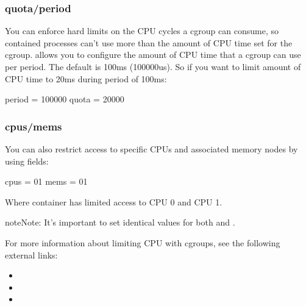 \documentclass[letterpaper,10pt,english]{sphinxmanual}
\begin{document}
\subsubsection{quota/period}
\label{\detokenize{cgroups:quota-period}}
You can enforce hard limits on the CPU cycles a cgroup can consume, so
contained processes can’t use more than the amount of CPU time set for the
cgroup.  allows you to configure the amount of CPU time that a cgroup
can use per period. The default is 100ms (100000us). So if you want to limit
amount of CPU time to 20ms during period of 100ms:

%
\begin{sphinxVerbatim}[commandchars=\\\{\}]
[cpu]
    period = 100000
    quota = 20000
\end{sphinxVerbatim}


\subsubsection{cpus/mems}
\label{\detokenize{cgroups:cpus-mems}}
You can also restrict access to specific CPUs and associated memory nodes by
using  fields:

%
\begin{sphinxVerbatim}[commandchars=\\\{\}]
[cpu]
    cpus = \PYGZdq{}0\PYGZhy{}1\PYGZdq{}
    mems = \PYGZdq{}0\PYGZhy{}1\PYGZdq{}
\end{sphinxVerbatim}

Where container has limited access to CPU 0 and CPU 1.

\begin{sphinxadmonition}{note}{Note:}
It’s important to set identical values for both  and .
\end{sphinxadmonition}

For more information about limiting CPU with cgroups, see the following external
links:
\begin{itemize}
\item {} 

\item {} 

\item {} 

\end{itemize}
\end{document}
